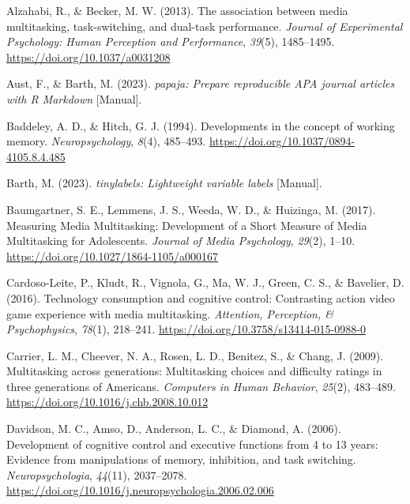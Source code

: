 \documentclass[
  man]{apa7}
\newlength{\cslhangindent}
\newenvironment{CSLReferences}[2] %
 {\begin{list}{}{%
  \setlength{\itemindent}{0pt}
  \setlength{\leftmargin}{0pt}
  \setlength{\parsep}{0pt}
  \ifodd #1
   \setlength{\leftmargin}{\cslhangindent}
   \setlength{\itemindent}{-1\cslhangindent}
  \fi
  \setlength{\itemsep}{#2\baselineskip}}}
 {\end{list}}
\begin{document}
\label{refs}
\begin{CSLReferences}{1}{0}
Alzahabi, R., \& Becker, M. W. (2013). The association between media multitasking, task-switching, and dual-task performance. \emph{Journal of Experimental Psychology: Human Perception and Performance}, \emph{39}(5), 1485--1495. \url{https://doi.org/10.1037/a0031208}

Aust, F., \& Barth, M. (2023). \emph{{papaja}: {Prepare} reproducible {APA} journal articles with {R Markdown}} {[}Manual{]}.

Baddeley, A. D., \& Hitch, G. J. (1994). Developments in the concept of working memory. \emph{Neuropsychology}, \emph{8}(4), 485--493. \url{https://doi.org/10.1037/0894-4105.8.4.485}

Barth, M. (2023). \emph{{tinylabels}: {Lightweight} variable labels} {[}Manual{]}.

Baumgartner, S. E., Lemmens, J. S., Weeda, W. D., \& Huizinga, M. (2017). Measuring {Media Multitasking}: {Development} of a {Short Measure} of {Media Multitasking} for {Adolescents}. \emph{Journal of Media Psychology}, \emph{29}(2), 1--10. \url{https://doi.org/10.1027/1864-1105/a000167}

Cardoso-Leite, P., Kludt, R., Vignola, G., Ma, W. J., Green, C. S., \& Bavelier, D. (2016). Technology consumption and cognitive control: {Contrasting} action video game experience with media multitasking. \emph{Attention, Perception, \& Psychophysics}, \emph{78}(1), 218--241. \url{https://doi.org/10.3758/s13414-015-0988-0}

Carrier, L. M., Cheever, N. A., Rosen, L. D., Benitez, S., \& Chang, J. (2009). Multitasking across generations: {Multitasking} choices and difficulty ratings in three generations of {Americans}. \emph{Computers in Human Behavior}, \emph{25}(2), 483--489. \url{https://doi.org/10.1016/j.chb.2008.10.012}

Davidson, M. C., Amso, D., Anderson, L. C., \& Diamond, A. (2006). Development of cognitive control and executive functions from 4 to 13 years: {Evidence} from manipulations of memory, inhibition, and task switching. \emph{Neuropsychologia}, \emph{44}(11), 2037--2078. \url{https://doi.org/10.1016/j.neuropsychologia.2006.02.006}


\end{CSLReferences}
\end{document}
